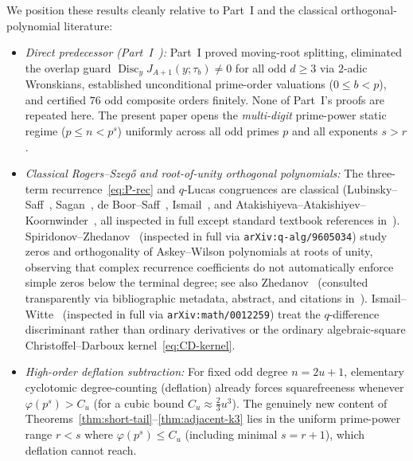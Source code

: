 \documentclass[11pt,reqno]{amsart}
\numberwithin{equation}{section}
\theoremstyle{definition}
\theoremstyle{remark}
\newcommand{\Disc}{\operatorname{Disc}}
\begin{document}
We position these results cleanly relative to Part~I and the classical orthogonal-polynomial literature:
\begin{itemize}[leftmargin=1.5em]
\item \emph{Direct predecessor (Part~I~\cite{KKKKK26rs}):} Part~I proved moving-root splitting, eliminated the overlap guard $\Disc_y J_{A+1}(y;\tau_b)\ne 0$ for all odd $d\ge 3$ via $2$-adic Wronskians, established unconditional prime-order valuations ($0\le b<p$), and certified $76$ odd composite orders finitely. None of Part~I's proofs are repeated here. The present paper opens the \emph{multi-digit} prime-power static regime ($p\le n < p^s$) uniformly across all odd primes $p$ and all exponents $s>r$.
\item \emph{Classical Rogers--Szeg\H{o} and root-of-unity orthogonal polynomials:} The three-term recurrence~\eqref{eq:P-rec} and $q$-Lucas congruences are classical (Lubinsky--Saff~\cite{LS87}, Sagan~\cite{Sag92}, de Boor--Saff~\cite{dBS86}, Ismail~\cite{Ism05}, and Atakishiyeva--Atakishiyev--Koornwinder~\cite{AKK09}, all inspected in full except standard textbook references in~\cite{Ism05}). Spiridonov--Zhedanov~\cite{SZ97} (inspected in full via \texttt{arXiv:q-alg/9605034}) study zeros and orthogonality of Askey--Wilson polynomials at roots of unity, observing that complex recurrence coefficients do not automatically enforce simple zeros below the terminal degree; see also Zhedanov~\cite{Zhe97} (consulted transparently via bibliographic metadata, abstract, and citations in~\cite{AKK09}). Ismail--Witte~\cite{IW01} (inspected in full via \texttt{arXiv:math/0012259}) treat the $q$-difference discriminant rather than ordinary derivatives or the ordinary algebraic-square Christoffel--Darboux kernel~\eqref{eq:CD-kernel}.
\item \emph{High-order deflation subtraction:} For fixed odd degree $n=2u+1$, elementary cyclotomic degree-counting (deflation) already forces squarefreeness whenever $\varphi(p^s) > C_u$ (for a cubic bound $C_u \approx \frac{2}{3}u^3$). The genuinely new content of Theorems~\ref{thm:short-tail}--\ref{thm:adjacent-k3} lies in the uniform prime-power range $r < s$ where $\varphi(p^s)\le C_u$ (including minimal $s=r+1$), which deflation cannot reach.
\end{itemize}
\end{document}
